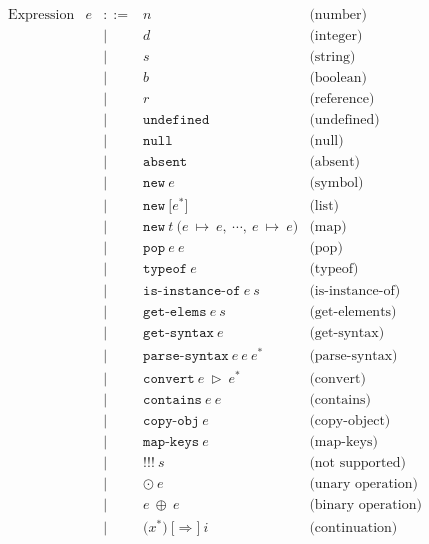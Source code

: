 \documentclass[11pt]{article}
\newcommand{\Term}[1]{\texttt{#1}}
\begin{document}
\[
\begin{array}{rrrll}
\text{Expression} & e & ::= & n & \text{(number)}\\
&&|& d & \text{(integer)}\\
&&|& s & \text{(string)}\\
&&|& b & \text{(boolean)}\\
&&|& r & \text{(reference)}\\
&&|& \Term{undefined} & \text{(undefined)}\\
&&|& \Term{null} & \text{(null)}\\
&&|& \Term{absent} & \text{(absent)}\\
&&|& \Term{new}\ e & \text{(symbol)}\\ %
&&|& \Term{new}\ \Term{[} e^* \Term{]} & \text{(list)}\\ %
&&|& \Term{new}\ t\ \Term{(} e\ \mapsto\ e,\ \cdots,\
e\ \mapsto\ e \Term{)} & \text{(map)}\\ %
&&|& \Term{pop}\ e\ e & \text{(pop)}\\
&&|& \Term{typeof}\ e & \text{(typeof)}\\
&&|& \Term{is-instance-of}\ e\ s& \text{(is-instance-of)}\\
&&|& \Term{get-elems}\ e\ s& \text{(get-elements)}\\
&&|& \Term{get-syntax}\ e& \text{(get-syntax)}\\
&&|& \Term{parse-syntax}\ e\ e\ e^*\ & \text{(parse-syntax)}\\
&&|& \Term{convert}\ e\ \triangleright\ e^*& \text{(convert)}\\
&&|& \Term{contains}\ e\ e& \text{(contains)}\\
&&|& \Term{copy-obj}\ e& \text{(copy-object)}\\
&&|& \Term{map-keys}\ e& \text{(map-keys)}\\
&&|& \Term{!!!}\ s& \text{(not supported)}\\
&&|& \odot\ e& \text{(unary operation)}\\ %
&&|& e\ \oplus\ e& \text{(binary operation)}\\ %
&&|& \Term{(} x^* \Term{)}\ \Term{[} \Rightarrow \Term{]}\ i
& \text{(continuation)}\\ %
\\

\end{array}
\]

\newpage
\end{document}
